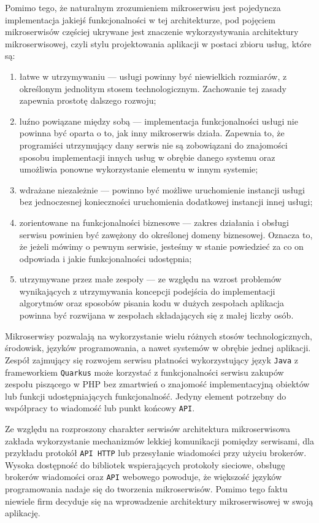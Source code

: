 \documentclass[12pt,twoside]{article}
\begin{document}
Pomimo tego, że naturalnym zrozumieniem mikroserwisu jest pojedyncza implementacja jakiejś funkcjonalności w tej architekturze, pod pojęciem mikroserwisów częściej ukrywane jest znaczenie wykorzystywania architektury mikroserwisowej, czyli stylu projektowania aplikacji w postaci zbioru usług, które są\cite{Richardson}:
\begin{enumerate}[label=\arabic*), leftmargin=1.25cm]
\item łatwe w utrzymywaniu — usługi powinny być niewielkich rozmiarów, z określonym jednolitym stosem technologicznym. Zachowanie tej zasady zapewnia prostotę dalszego rozwoju;
\item luźno powiązane między sobą — implementacja funkcjonalności usługi nie powinna być oparta o to, jak inny mikroserwis działa. Zapewnia to, że programiści utrzymujący dany serwis nie są zobowiązani do znajomości sposobu implementacji innych usług w obrębie danego systemu oraz umożliwia ponowne wykorzystanie elementu w innym systemie;
\item wdrażane niezależnie — powinno być możliwe uruchomienie instancji usługi bez jednoczesnej konieczności uruchomienia dodatkowej instancji innej usługi;
\item zorientowane na funkcjonalności biznesowe — zakres działania i obsługi serwisu powinien być zawężony do określonej domeny biznesowej. Oznacza to, że jeżeli mówimy o pewnym serwisie, jesteśmy w stanie powiedzieć za co on odpowiada i jakie funkcjonalności udostępnia;
\item utrzymywane przez małe zespoły — ze względu na wzrost problemów wynikających z utrzymywania koncepcji podejścia do implementacji algorytmów oraz sposobów pisania kodu w dużych zespołach aplikacja powinna być rozwijana w zespołach składających się z małej liczby osób.\end{enumerate}

Mikroserwisy pozwalają na wykorzystanie wielu różnych stosów technologicznych, środowisk, języków programowania, a nawet systemów w obrębie jednej aplikacji. Zespół zajmujący się rozwojem serwisu płatności wykorzystujący język \texttt{Java} z frameworkiem \texttt{Quarkus} może korzystać z funkcjonalności serwisu zakupów zespołu piszącego w PHP bez zmartwień o znajomość implementacyjną obiektów lub funkcji udostępniających funkcjonalność. Jedyny element potrzebny do współpracy to wiadomość lub punkt końcowy \texttt{API}.

Ze względu na rozproszony charakter serwisów architektura mikroserwisowa zakłada wykorzystanie mechanizmów lekkiej komunikacji pomiędzy serwisami, dla przykładu protokół \texttt{API HTTP} lub przesyłanie wiadomości przy użyciu brokerów. Wysoka dostępność do bibliotek wspierających protokoły sieciowe, obsługę brokerów wiadomości oraz \texttt{API} webowego powoduje, że większość języków programowania nadaje się do tworzenia mikroserwisów. Pomimo tego faktu niewiele firm decyduje się na wprowadzenie architektury mikroserwisowej w swoją aplikację.
\end{document}

